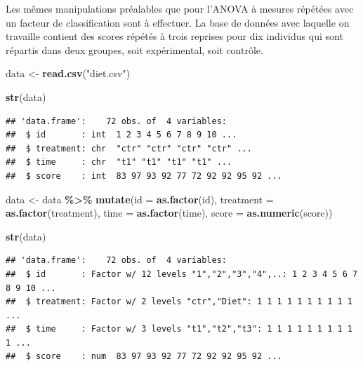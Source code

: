 \documentclass[
]{book}
\newenvironment{Shaded}{\begin{snugshade}}{\end{snugshade}}
\newcommand{\AttributeTok}[1]{\textcolor[rgb]{0.13,0.29,0.53}{#1}}
\newcommand{\FunctionTok}[1]{\textcolor[rgb]{0.13,0.29,0.53}{\textbf{#1}}}
\newcommand{\NormalTok}[1]{#1}
\newcommand{\OtherTok}[1]{\textcolor[rgb]{0.56,0.35,0.01}{#1}}
\newcommand{\SpecialCharTok}[1]{\textcolor[rgb]{0.81,0.36,0.00}{\textbf{#1}}}
\newcommand{\StringTok}[1]{\textcolor[rgb]{0.31,0.60,0.02}{#1}}
\begin{document}
Les mêmes manipulations préalables que pour l'ANOVA à mesures répétées avec un facteur de classification sont à effectuer. La base de données avec laquelle on travaille contient des scores répétés à trois reprises pour dix individus qui sont répartis dans deux groupes, soit expérimental, soit contrôle.

\begin{Shaded}
\begin{Highlighting}[]
\NormalTok{data }\OtherTok{\textless{}{-}} \FunctionTok{read.csv}\NormalTok{(}\StringTok{"diet.csv"}\NormalTok{)}

\FunctionTok{str}\NormalTok{(data)}
\end{Highlighting}
\end{Shaded}

\begin{verbatim}
## 'data.frame':    72 obs. of  4 variables:
##  $ id       : int  1 2 3 4 5 6 7 8 9 10 ...
##  $ treatment: chr  "ctr" "ctr" "ctr" "ctr" ...
##  $ time     : chr  "t1" "t1" "t1" "t1" ...
##  $ score    : int  83 97 93 92 77 72 92 92 95 92 ...
\end{verbatim}

\begin{Shaded}
\begin{Highlighting}[]
\NormalTok{data }\OtherTok{\textless{}{-}}\NormalTok{ data }\SpecialCharTok{\%\textgreater{}\%}
  \FunctionTok{mutate}\NormalTok{(}\AttributeTok{id =} \FunctionTok{as.factor}\NormalTok{(id),}
         \AttributeTok{treatment =} \FunctionTok{as.factor}\NormalTok{(treatment),}
         \AttributeTok{time =} \FunctionTok{as.factor}\NormalTok{(time), }
         \AttributeTok{score =} \FunctionTok{as.numeric}\NormalTok{(score))}

\FunctionTok{str}\NormalTok{(data)}
\end{Highlighting}
\end{Shaded}

\begin{verbatim}
## 'data.frame':    72 obs. of  4 variables:
##  $ id       : Factor w/ 12 levels "1","2","3","4",..: 1 2 3 4 5 6 7 8 9 10 ...
##  $ treatment: Factor w/ 2 levels "ctr","Diet": 1 1 1 1 1 1 1 1 1 1 ...
##  $ time     : Factor w/ 3 levels "t1","t2","t3": 1 1 1 1 1 1 1 1 1 1 ...
##  $ score    : num  83 97 93 92 77 72 92 92 95 92 ...
\end{verbatim}

\begin{Shaded}
\end{Shaded}
\end{document}
